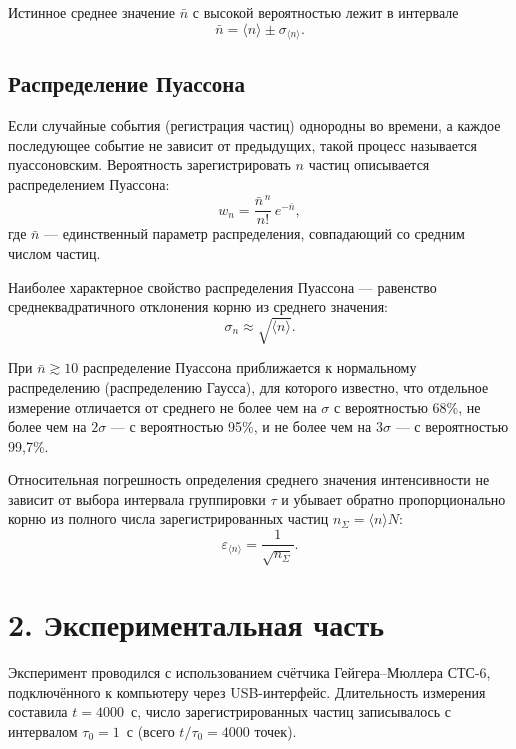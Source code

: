 \documentclass[12pt,a4paper]{article}
\begin{document}
Истинное среднее значение $\bar n$ с высокой вероятностью лежит в интервале
\begin{equation}
    \bar n = \langle n\rangle \pm \sigma_{\langle n\rangle}.
    \label{eq:final_result}
\end{equation}

\subsection*{Распределение Пуассона}

Если случайные события (регистрация частиц) однородны во времени, а каждое последующее событие не зависит от предыдущих, такой процесс называется пуассоновским. Вероятность зарегистрировать $n$ частиц описывается распределением Пуассона:
\begin{equation}
    w_n = \frac{\bar n^{\,n}}{n!}\,e^{-\bar n},
    \label{eq:poisson}
\end{equation}
где $\bar n$ — единственный параметр распределения, совпадающий со средним числом частиц.

Наиболее характерное свойство распределения Пуассона — равенство среднеквадратичного отклонения корню из среднего значения:
\begin{equation}
    \sigma_n \approx \sqrt{\langle n\rangle}.
    \label{eq:poisson_property}
\end{equation}

При $\bar n \gtrsim 10$ распределение Пуассона приближается к нормальному распределению (распределению Гаусса), для которого известно, что отдельное измерение отличается от среднего не более чем на $\sigma$ с вероятностью 68\%, не более чем на $2\sigma$ — с вероятностью 95\%, и не более чем на $3\sigma$ — с вероятностью 99{,}7\%.

Относительная погрешность определения среднего значения интенсивности не зависит от выбора интервала группировки $\tau$ и убывает обратно пропорционально корню из полного числа зарегистрированных частиц $n_\Sigma = \langle n\rangle N$:
\begin{equation}
    \varepsilon_{\langle n\rangle} = \frac{1}{\sqrt{n_\Sigma}}.
    \label{eq:rel_error}
\end{equation}

\section*{2. Экспериментальная часть}

Эксперимент проводился с использованием счётчика Гейгера--Мюллера СТС-6, подключённого к компьютеру через USB-интерфейс. Длительность измерения составила $t = 4000$~с, число зарегистрированных частиц записывалось с интервалом $\tau_0 = 1$~с (всего $t/\tau_0 = 4000$ точек).
\end{document}
